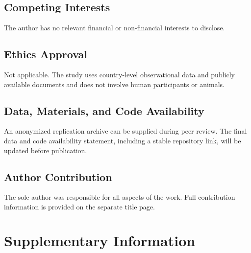\documentclass[referee,pdflatex,sn-basic]{sn-jnl}
\theoremstyle{thmstylethree}
\begin{document}
\subsection*{Competing Interests}\label{competing-interests}

The author has no relevant financial or non-financial interests to disclose.

\subsection*{Ethics Approval}\label{ethics-approval}

Not applicable. The study uses country-level observational data and publicly available documents and does not involve human participants or animals.

\subsection*{Data, Materials, and Code Availability}\label{data-materials-and-code-availability}

An anonymized replication archive can be supplied during peer review. The final data and code availability statement, including a stable repository link, will be updated before publication.

\subsection*{Author Contribution}\label{author-contribution}

The sole author was responsible for all aspects of the work. Full contribution information is provided on the separate title page.

\clearpage



\clearpage

\section*{Supplementary Information}\label{supplementary-information}

\setcounter{figure}{0}
\renewcommand{\thefigure}{S\arabic{figure}}
\setcounter{table}{0}
\renewcommand{\thetable}{S\arabic{table}}
\setcounter{equation}{0}
\renewcommand{\theequation}{S\arabic{equation}}
\end{document}
